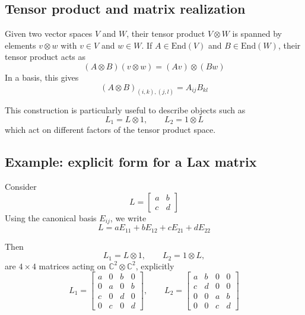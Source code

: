 \subsection{Tensor product and matrix realization}

Given two vector spaces $V$ and $W$, their tensor product $V \otimes W$ is spanned by elements $v \otimes w$ with $v \in V$ and $w \in W$.  
If $A \in \mathrm{End}(V)$ and $B \in \mathrm{End}(W)$, their tensor product acts as
\begin{equation}
    (A \otimes B)(v \otimes w) = (Av) \otimes (Bw)
\end{equation}
In a basis, this gives
\begin{equation}
    (A \otimes B)_{(i,k),(j,l)} = A_{ij} B_{kl}
\end{equation}

This construction is particularly useful to describe objects such as
\begin{equation}
    L_1 = L \otimes 1, \qquad L_2 = 1 \otimes L
\end{equation}
which act on different factors of the tensor product space.

\subsection{Example: explicit form for a Lax matrix}

Consider
\begin{equation}
    L =
    \begin{bmatrix}
    a & b \\
    c & d
    \end{bmatrix}
\end{equation}
Using the canonical basis $E_{ij}$, we write
\begin{equation}
    L = aE_{11} + bE_{12} + cE_{21} + dE_{22}
\end{equation}

Then
\begin{equation}
    L_1 = L \otimes 1, \qquad L_2 = 1 \otimes L,
\end{equation}
are $4 \times 4$ matrices acting on $\mathbb{C}^2 \otimes \mathbb{C}^2$, explicitly
\begin{equation}
    L_1 =
    \begin{bmatrix}
    a & 0 & b & 0 \\
    0 & a & 0 & b \\
    c & 0 & d & 0 \\
    0 & c & 0 & d
    \end{bmatrix},
    \qquad
    L_2 =
    \begin{bmatrix}
    a & b & 0 & 0 \\
    c & d & 0 & 0 \\
    0 & 0 & a & b \\
    0 & 0 & c & d
    \end{bmatrix}
\end{equation}

